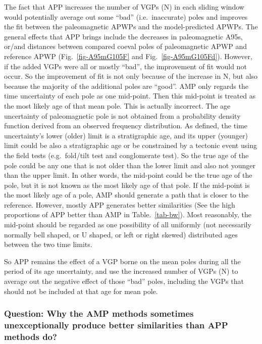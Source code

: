 The fact that APP increases the number of VGPs (N) in each sliding window
would potentially average out some ``bad'' (i.e.\ inaccurate) poles and improves
the fit between the paleomagnetic APWPs and the model-predicted APWPs. The
general effects that APP brings include the decreases in paleomagnetic A95s,
or/and distances between compared coeval poles of paleomagnetic APWP and
reference APWP (Fig.~\ref{fig-A95mG105F} and Fig.~\ref{fig-A95mG105Fd}).
However, if the added VGPs were all or mostly ``bad'', the improvement of fit
would not occur. So the improvement of fit is not only because of the increase
in N, but also because the majority of the additional poles are ``good''. AMP
only regards the time uncertainty of each pole as one mid-point. Then this
mid-point is treated as the most likely age of that mean pole. This is actually
incorrect. The age uncertainty of paleomagnetic pole is not obtained from a
probability density function derived from an observed frequency distribution.
As defined, the time uncertainty's lower (older) limit is a stratigraphic age,
and its upper (younger) limit could be also a stratigraphic age or be
constrained by a tectonic event using the field tests (e.g.\ fold/tilt test and
conglomerate test). So the true age of the pole could be any one that is not
older than the lower limit and also not younger than the upper limit. In other
words, the mid-point could be the true age of the pole, but it is not known as
the most likely age of that pole. If the mid-point is the most likely age of a
pole, AMP should generate a path that is closer to the reference. However,
mostly APP generates better similarities (See the high proportions of APP better
than AMP in Table.~\ref{tab-bw}). Most reasonably, the mid-point should be
regarded as one possibility of all uniformly (not necessarily normally bell
shaped, or U shaped, or left or right skewed) distributed ages between the two
time limits.

So APP remains the effect of a VGP borne on the mean poles during all the period
of its age uncertainty, and use the increased number of VGPs (N) to average out
the negative effect of those ``bad'' poles, including the VGPs that should not
be included at that age for mean pole.

\subsubsection{Question: Why the AMP methods sometimes unexceptionally produce
better similarities than APP methods do?}

